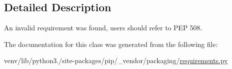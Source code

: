 \subsection{Detailed Description}
\begin{DoxyVerb}An invalid requirement was found, users should refer to PEP 508.
\end{DoxyVerb}
 

The documentation for this class was generated from the following file\+:\begin{DoxyCompactItemize}
\item 
venv/lib/python3./site-\/packages/pip/\+\_\+vendor/packaging/\hyperlink{pip_2__vendor_2packaging_2requirements_8py}{requirements.\+py}\end{DoxyCompactItemize}

